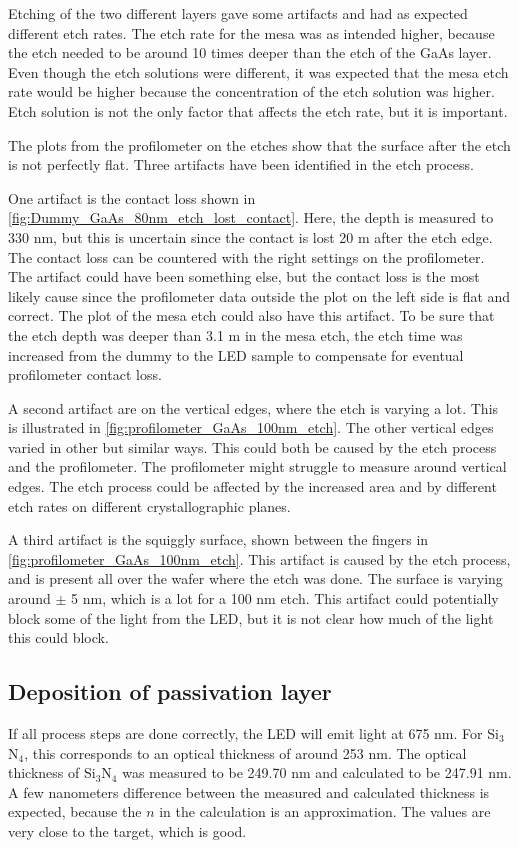 \noindent Etching of the two different layers gave some artifacts and had as expected different etch rates.
The etch rate for the mesa was as intended higher, because the etch needed to be around 10 times deeper than the etch of the GaAs layer.
Even though the etch solutions were different, it was expected that the mesa etch rate would be higher because the concentration of the etch solution was higher.
Etch solution is not the only factor that affects the etch rate, but it is important.

The plots from the profilometer on the etches show that the surface after the etch is not perfectly flat.
Three artifacts have been identified in the etch process.

One artifact is the contact loss shown in \autoref{fig:Dummy_GaAs_80nm_etch_lost_contact}. 
Here, the depth is measured to 330 nm, but this is uncertain since the contact is lost 20 \textmu m after the etch edge.
The contact loss can be countered with the right settings on the profilometer. 
The artifact could have been something else, but the contact loss is the most likely cause since the profilometer data outside the plot on the left side is flat and correct. 
The plot of the mesa etch could also have this artifact. 
To be sure that the etch depth was deeper than 3.1 \textmu m in the mesa etch, the etch time was increased from the dummy to the LED sample to compensate for eventual profilometer contact loss.

A second artifact are on the vertical edges, where the etch is varying a lot. 
This is illustrated in \autoref{fig:profilometer_GaAs_100nm_etch}.
The other vertical edges varied in other but similar ways. 
This could both be caused by the etch process and the profilometer.
The profilometer might struggle to measure around vertical edges. 
The etch process could be affected by the increased area and by different etch rates on different crystallographic planes.

A third artifact is the squiggly surface, shown between the fingers in \autoref{fig:profilometer_GaAs_100nm_etch}. 
This artifact is caused by the etch process, and is present all over the wafer where the etch was done. 
The surface is varying around $\pm$ 5 nm, which is a lot for a 100 nm etch.
This artifact could potentially block some of the light from the LED, but it is not clear how much of the light this could block.

\subsection{Deposition of passivation layer} 
\noindent If all process steps are done correctly, the LED will emit light at 675 nm.  
For Si$_3$N$_4$, this corresponds to an optical thickness of around 253 nm.
The optical thickness of Si$_3$N$_4$ was measured to be 249.70 nm and calculated to be 247.91 nm.
A few nanometers difference between the measured and calculated thickness is expected, because the $n$ in the calculation is an approximation. 
The values are very close to the target, which is good.

